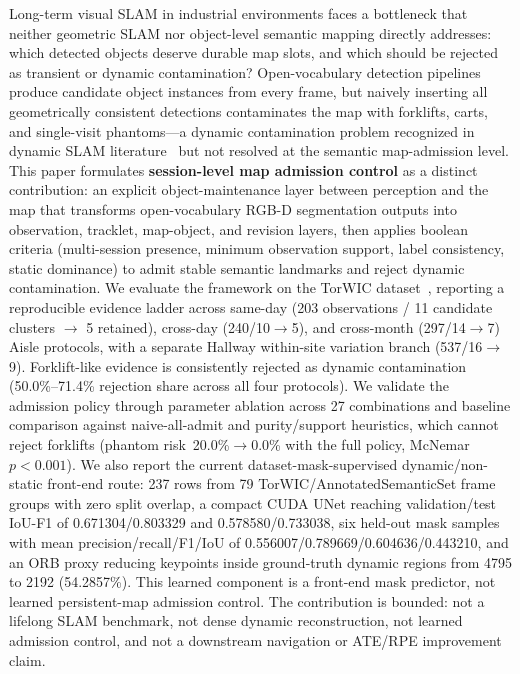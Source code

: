 Long-term visual SLAM in industrial environments faces a bottleneck that neither geometric SLAM nor object-level semantic mapping directly addresses: which detected objects deserve durable map slots, and which should be rejected as transient or dynamic contamination? Open-vocabulary detection pipelines produce candidate object instances from every frame, but naively inserting all geometrically consistent detections contaminates the map with forklifts, carts, and single-visit phantoms---a dynamic contamination problem recognized in dynamic SLAM literature~\cite{bescos2018dynaslam} but not resolved at the semantic map-admission level. This paper formulates \textbf{session-level map admission control} as a distinct contribution: an explicit object-maintenance layer between perception and the map that transforms open-vocabulary RGB-D segmentation outputs into observation, tracklet, map-object, and revision layers, then applies boolean criteria (multi-session presence, minimum observation support, label consistency, static dominance) to admit stable semantic landmarks and reject dynamic contamination. We evaluate the framework on the TorWIC dataset~\cite{barath2023povslam}, reporting a reproducible evidence ladder across same-day (203 observations / 11 candidate clusters $\rightarrow$ 5 retained), cross-day (240/10$\rightarrow$5), and cross-month (297/14$\rightarrow$7) Aisle protocols, with a separate Hallway within-site variation branch (537/16$\rightarrow$9). Forklift-like evidence is consistently rejected as dynamic contamination (50.0\%--71.4\% rejection share across all four protocols). We validate the admission policy through parameter ablation across 27 combinations and baseline comparison against naive-all-admit and purity/support heuristics, which cannot reject forklifts (phantom risk~20.0\%$\rightarrow$0.0\% with the full policy, McNemar $p{<}0.001$). We also report the current dataset-mask-supervised dynamic/non-static front-end route: 237 rows from 79 TorWIC/AnnotatedSemanticSet frame groups with zero split overlap, a compact CUDA UNet reaching validation/test IoU-F1 of 0.671304/0.803329 and 0.578580/0.733038, six held-out mask samples with mean precision/recall/F1/IoU of 0.556007/0.789669/0.604636/0.443210, and an ORB proxy reducing keypoints inside ground-truth dynamic regions from 4795 to 2192 (54.2857\%). This learned component is a front-end mask predictor, not learned persistent-map admission control. The contribution is bounded: not a lifelong SLAM benchmark, not dense dynamic reconstruction, not learned admission control, and not a downstream navigation or ATE/RPE improvement claim.
